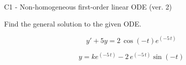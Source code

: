 \begin{exercise}
  \begin{exerciseTitle}C1 - Non-homogeneous first-order linear ODE (ver. 2)\end{exerciseTitle}
  \begin{exerciseStatement}
    
Find the general solution to the given ODE.

    
\[y'+5y= 2 \, \cos\left(-t\right) e^{\left(-5 \, t\right)}\]

  \end{exerciseStatement}
  \begin{exerciseAnswer}
    
\[y= k e^{\left(-5 \, t\right)} - 2 \, e^{\left(-5 \, t\right)} \sin\left(-t\right)\]

  \end{exerciseAnswer}
\end{exercise}